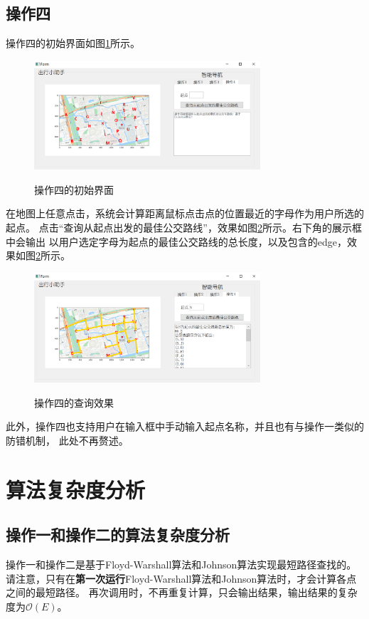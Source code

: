 \documentclass{article}
\begin{document}
\subsection{操作四}
操作四的初始界面如图\ref{op4.init}所示。
\begin{figure}[H]
	\centering
	{\includegraphics[width=0.75\textwidth]{image//操作四初始界面.png}} 
	\caption{操作四的初始界面} \label{op4.init} 
\end{figure}

在地图上任意点击，系统会计算距离鼠标点击点的位置最近的字母作为用户所选的起点。
点击“查询从起点出发的最佳公交路线”，效果如图\ref{op4.result}所示。右下角的展示框中会输出
以用户选定字母为起点的最佳公交路线的总长度，以及包含的edge，效果如图\ref{op4.result}所示。
\begin{figure}[H]
	\centering
	{\includegraphics[width=0.75\textwidth]{image//操作四结果.png}} 
	\caption{操作四的查询效果} \label{op4.result} 
\end{figure}

此外，操作四也支持用户在输入框中手动输入起点名称，并且也有与操作一类似的防错机制，
此处不再赘述。

\section{算法复杂度分析}
\subsection{操作一和操作二的算法复杂度分析}
操作一和操作二是基于Floyd-Warshall算法和Johnson算法实现最短路径查找的。
请注意，只有在\textbf{第一次运行}Floyd-Warshall算法和Johnson算法时，才会计算各点之间的最短路径。
再次调用时，不再重复计算，只会输出结果，输出结果的复杂度为$\mathcal{O}(E)$。
\end{document}

